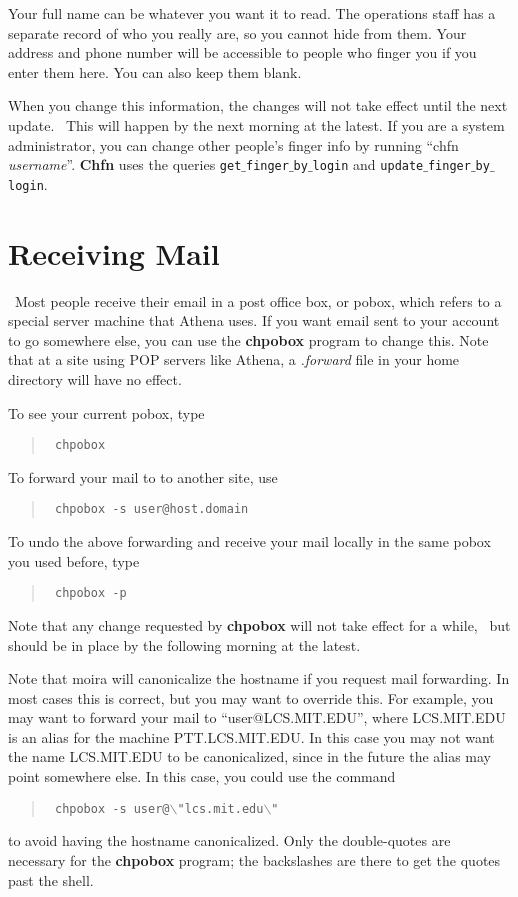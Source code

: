 Your full name can be whatever you want it to read.  The operations
staff has a separate record of who you really are, so you cannot hide
from them.  Your address and phone number will be accessible to people
who finger you if you enter them here.  You can also keep them blank.

When you change this information, the changes will not take effect
until the next update.  \athena\ This will happen by the next morning
at the latest.  If you are a system administrator, you can change
other people's finger info by running ``chfn {\em username}''.  {\bf Chfn}
uses the queries {\tt get$\_$finger$\_$by$\_$login} and {\tt update$\_$finger$\_$by$\_$login}.

\section{Receiving Mail}

\label{pobox}

\athena\ Most people receive their email in a post office box, or
pobox, which refers to a special server machine that Athena uses.  If
you want email sent to your account to go somewhere else, you can use
the {\bf chpobox} program to change this.  Note that at a site using POP
servers like Athena, a {\em .forward} file in your home directory will
have no effect.

To see your current pobox, type
\begin{quotation}\tt
chpobox
\end{quotation}
To forward your mail to to another site, use
\begin{quotation}\tt
chpobox -s user@host.domain
\end{quotation}
To undo the above forwarding and receive your mail locally in the same
pobox you used before, type
\begin{quotation}\tt
chpobox -p
\end{quotation}
Note that any change requested by {\bf chpobox} will not take effect for a
while, \athena\ but should be in place by the following morning at
the latest.

Note that moira will canonicalize the hostname if you request mail
forwarding.  In most cases this is correct, but you may want to
override this.  For example, you may want to forward your mail to
``user@LCS.MIT.EDU'', where LCS.MIT.EDU is an alias for the machine
PTT.LCS.MIT.EDU.  In this case you may not want the name LCS.MIT.EDU
to be canonicalized, since in the future the alias may point
somewhere else.  In this case, you could use the command
\begin{quotation}\tt
chpobox -s user@$\backslash$"lcs.mit.edu$\backslash$"
\end{quotation}
to avoid having the hostname canonicalized.  Only the double-quotes
are necessary for the {\bf chpobox} program; the backslashes are there to
get the quotes past the shell.

